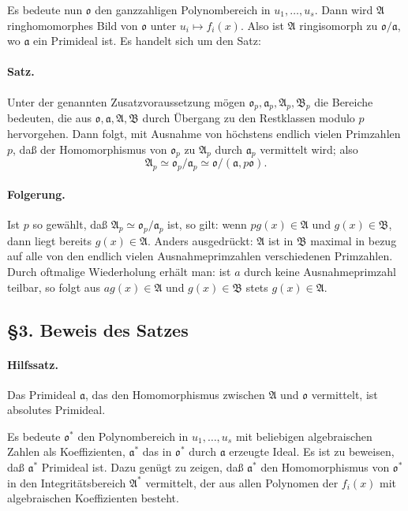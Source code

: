 \documentclass[11pt]{article}
\providecommand{\frakA}{\mathfrak A}
\providecommand{\frakB}{\mathfrak B}
\providecommand{\frako}{\mathfrak o}
\providecommand{\fraka}{\mathfrak a}
\begin{document}
Es bedeute nun \(\frako\) den ganzzahligen Polynombereich in \(u_1,\ldots,u_s\). Dann wird \(\frakA\) ringhomomorphes Bild von \(\frako\) unter \(u_i\mapsto f_i(x)\). Also ist \(\frakA\) ringisomorph zu \(\frako/\fraka\), wo \(\fraka\) ein Primideal ist. Es handelt sich um den Satz:

\paragraph{Satz.}
Unter der genannten Zusatzvoraussetzung mögen \(\frako_p,\fraka_p,\frakA_p,\frakB_p\) die Bereiche bedeuten, die aus \(\frako,\fraka,\frakA,\frakB\) durch Übergang zu den Restklassen modulo \(p\) hervorgehen. Dann folgt, mit Ausnahme von höchstens endlich vielen Primzahlen \(p\), daß der Homomorphismus von \(\frako_p\) zu \(\frakA_p\) durch \(\fraka_p\) vermittelt wird; also
\[
        \frakA_p\simeq \frako_p/\fraka_p
        \simeq \frako/(\fraka,p\frako).
\]

\paragraph{Folgerung.}
Ist \(p\) so gewählt, daß \(\frakA_p\simeq\frako_p/\fraka_p\) ist, so gilt: wenn \(p g(x)\in\frakA\) und \(g(x)\in\frakB\), dann liegt bereits \(g(x)\in\frakA\). Anders ausgedrückt: \(\frakA\) ist in \(\frakB\) maximal in bezug auf alle von den endlich vielen Ausnahmeprimzahlen verschiedenen Primzahlen. Durch oftmalige Wiederholung erhält man: ist \(a\) durch keine Ausnahmeprimzahl teilbar, so folgt aus \(a g(x)\in\frakA\) und \(g(x)\in\frakB\) stets \(g(x)\in\frakA\).

\subsection*{§3. Beweis des Satzes}

\paragraph{Hilfssatz.}
Das Primideal \(\fraka\), das den Homomorphismus zwischen \(\frakA\) und \(\frako\) vermittelt, ist absolutes Primideal.

Es bedeute \(\frako^*\) den Polynombereich in \(u_1,\ldots,u_s\) mit beliebigen algebraischen Zahlen als Koeffizienten, \(\fraka^*\) das in \(\frako^*\) durch \(\fraka\) erzeugte Ideal. Es ist zu beweisen, daß \(\fraka^*\) Primideal ist. Dazu genügt zu zeigen, daß \(\fraka^*\) den Homomorphismus von \(\frako^*\) in den Integritätsbereich \(\frakA^*\) vermittelt, der aus allen Polynomen der \(f_i(x)\) mit algebraischen Koeffizienten besteht.
\end{document}

